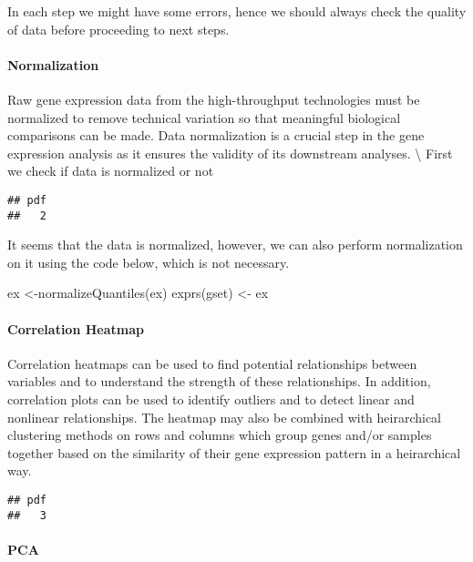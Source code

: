 \documentclass[
]{article}
\newenvironment{Shaded}{\begin{snugshade}}{\end{snugshade}}
\newcommand{\FunctionTok}[1]{\textcolor[rgb]{0.00,0.00,0.00}{#1}}
\newcommand{\NormalTok}[1]{#1}
\newcommand{\OtherTok}[1]{\textcolor[rgb]{0.56,0.35,0.01}{#1}}
\begin{document}
In each step we might have some errors, hence we should always check the
quality of data before proceeding to next steps.

\hypertarget{normalization}{%
\paragraph{Normalization}\label{normalization}}

Raw gene expression data from the high-throughput technologies must be
normalized to remove technical variation so that meaningful biological
comparisons can be made. Data normalization is a crucial step in the
gene expression analysis as it ensures the validity of its downstream
analyses. \textbackslash{} First we check if data is normalized or not

\begin{verbatim}
## pdf 
##   2
\end{verbatim}

It seems that the data is normalized, however, we can also perform
normalization on it using the code below, which is not necessary.

\begin{Shaded}
\begin{Highlighting}[]
\NormalTok{ex }\OtherTok{\textless{}{-}}\FunctionTok{normalizeQuantiles}\NormalTok{(ex) }
\FunctionTok{exprs}\NormalTok{(gset) }\OtherTok{\textless{}{-}}\NormalTok{ ex}
\end{Highlighting}
\end{Shaded}

\hypertarget{correlation-heatmap}{%
\paragraph{Correlation Heatmap}\label{correlation-heatmap}}

Correlation heatmaps can be used to find potential relationships between
variables and to understand the strength of these relationships. In
addition, correlation plots can be used to identify outliers and to
detect linear and nonlinear relationships. The heatmap may also be
combined with heirarchical clustering methods on rows and columns which
group genes and/or samples together based on the similarity of their
gene expression pattern in a heirarchical way.

\begin{verbatim}
## pdf 
##   3
\end{verbatim}

\hypertarget{pca}{%
\paragraph{PCA}\label{pca}}
\end{document}
